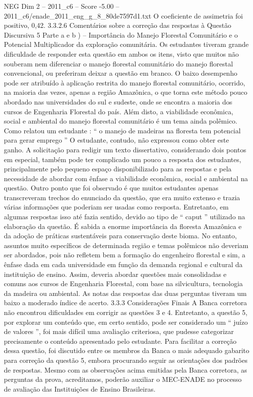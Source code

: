 \begin{textsample}{NEG Dim 2 – 2011\_c6 – Score -5.00 – 2011\_c6/enade\_2011\_eng\_g\_8\_80de7597d1.txt}
O coeficiente de assimetria foi positivo, 0,42. 3.3.2.6 Comentários sobre a correção das respostas à Questão Discursiva 5 Parte a e b ) – Importância do Manejo Florestal Comunitário e o Potencial Multiplicador da exploração comunitária.
Os estudantes tiveram grande dificuldade de responder esta questão em ambos os itens, visto que muitos não souberam nem diferenciar o manejo florestal comunitário do manejo florestal convencional, ou preferiram deixar a questão em branco.
O baixo desempenho pode ser atribuído à aplicação restrita do manejo florestal comunitário, ocorrido, na maioria das vezes, apenas a região Amazônica, o que torna este método pouco abordado nas universidades do sul e sudeste, onde se encontra a maioria dos cursos de Engenharia Florestal do país.
Além disto, a viabilidade econômica, social e ambiental do manejo florestal comunitário é um tema ainda polêmico.
Como relatou um estudante : “ o manejo de madeiras na floresta tem potencial para gerar emprego ” O estudante, contudo, não expressou como obter este ganho.
A solicitação para redigir um texto dissertativo, considerando dois pontos em especial, também pode ter complicado um pouco a resposta dos estudantes, principalmente pelo pequeno espaço disponibilizado para as respostas e pela necessidade de abordar com ênfase a viabilidade econômica, social e ambiental na questão.
Outro ponto que foi observado é que muitos estudantes apenas transcreveram trechos do enunciado da questão, que era muito extenso e trazia várias informações que poderiam ser usadas como resposta.
Entretanto, em algumas respostas isso até fazia sentido, devido ao tipo de “ caput ” utilizado na elaboração da questão.
É sabida a enorme importância da floresta Amazônica e da adoção de práticas sustentáveis para conservação deste bioma.
No entanto, assuntos muito específicos de determinada região e temas polêmicos não deveriam ser abordados, pois não refletem bem a formação do engenheiro florestal e sim, a ênfase dada em cada universidade em função da demanda regional e cultural da instituição de ensino.
Assim, deveria abordar questões mais consolidadas e comuns aos cursos de Engenharia Florestal, com base na silvicultura, tecnologia da madeira ou ambiental.
As notas das respostas das duas perguntas tiveram um baixo a moderado índice de acerto. 3.3.3 Considerações Finais A Banca corretora não encontrou dificuldades em corrigir as questões 3 e 4.
Entretanto, a questão 5, por explorar um conteúdo que, em certo sentido, pode ser considerado um “ juízo de valores ”, foi mais difícil uma avaliação criteriosa, que pudesse categorizar precisamente o conteúdo apresentado pelo estudante.
Para facilitar a correção dessa questão, foi discutido entre os membros da Banca o mais adequado gabarito para correção da questão 5, embora procurando seguir as orientações dos padrões de respostas.
Mesmo com as observações acima emitidas pela Banca corretora, as perguntas da prova, acreditamos, poderão auxiliar o MEC-ENADE no processo de avaliação das Instituições de Ensino Brasileiras.

\end{textsample}

